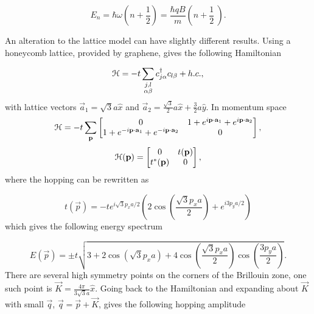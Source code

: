 \begin{equation}
  E_n = \hbar \omega \left(n + \dfrac{1}{2} \right) = \dfrac{\hbar q B}{m} \left(n+\dfrac{1}{2}\ \right).
\end{equation}

An alteration to the lattice model can have slightly different results.
Using a honeycomb lattice, provided by graphene, gives the following Hamiltonian

\begin{equation}
  \mathcal{H} = -t \sum_{\substack{j, l \\ \alpha \beta}} c^{\dagger}_{j\alpha} c_{l\beta} + h.c.,
\end{equation}
with lattice vectors $\vec{a}_1 = \sqrt{3} a \hat{x}$ and $\vec{a}_2 = \tfrac{\sqrt{3}}{2} a \hat{x} + \tfrac{3}{2} a \hat{y}$.
In momentum space
\[
  \mathcal{H} = -t \sum_{\mathbf{p}}
  \begin{bmatrix}
    0 & 1 + e^{i\mathbf{p}\cdot \mathbf{a}_1 } + e^{i \mathbf{p}\cdot \mathbf{a}_2} \\
    1 + e^{-i\mathbf{p}\cdot \mathbf{a}_1 } + e^{-i \mathbf{p}\cdot \mathbf{a}_2} & 0
  \end{bmatrix},
\]
\[
  \mathcal{H}(\mathbf{p}) =
  \begin{bmatrix}
    0 & t(\mathbf{p}) \\
    t^*(\mathbf{p}) & 0
  \end{bmatrix},
\]
where the hopping can be rewritten as

\begin{equation}
  t(\vec{p}) = -t e^{i\sqrt{3} p_x a / 2} \left( 2\cos{\left( \dfrac{\sqrt{3} p_x a }{ 2 } \right)} + e^{i 3 p_y a /2 } \right)
\end{equation}
which gives the following energy spectrum

\begin{equation}
  E(\vec{p}) = \pm t \sqrt{3 + 2\cos{\left(\sqrt{3}p_x a\right)} + 4\cos{\left(\dfrac{\sqrt{3}p_x a}{2}\right)}\cos{\left(\dfrac{3p_y a}{2}\right)} }.
\end{equation}
There are several high symmetry points on the corners of the Brillouin zone, one such point is $\vec{K} = \tfrac{4\pi}{3\sqrt{3}a} \hat{x} $.
Going back to the Hamiltonian and expanding about $\vec{K}$ with small $\vec{q}$, $\vec{q} = \vec{p} + \vec{K}$, gives the following hopping amplitude

